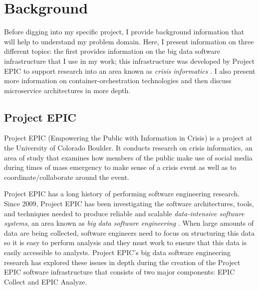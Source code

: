
\chapter{Background} %

\label{Chapter2} %


Before digging into my specific project, I provide background information that will help to understand my problem domain. Here, I present information on three different topics: the first provides information on the big data software infrastructure that I use in my work; this infrastructure was developed by Project EPIC \parencite{icse11,oopsla12,hiccs15} to support research into an area known as \textit{crisis informatics} \parencite{palen2009,palen2010}. I also present more information on container-orchestration technologies and then discuss microservice architectures in more depth.

\section{Project EPIC}

Project EPIC (Empowering the Public with Information in Crisis) is a project at the University of Colorado Boulder. It conducts research on crisis informatics, an area of study that examines how members of the public make use of social media during times of mass emergency to make sense of a crisis event as well as to coordinate/collaborate around the event.

Project EPIC has a long history of performing software engineering research. Since 2009, Project EPIC has been investigating the software architectures, tools, and techniques needed to produce reliable and scalable \textit{data-intensive software systems}, an area known as \textit{big data software engineering} \parencite{Anderson:2015b}. When large amounts of data are being collected, software engineers need to focus on structuring this data so it is easy to perform analysis and they must work to ensure that this data is easily accessible to analysts. Project EPIC’s big data software engineering research has explored these issues in depth during the creation of the Project EPIC software infrastructure that consists of two major components: EPIC Collect and EPIC Analyze.

